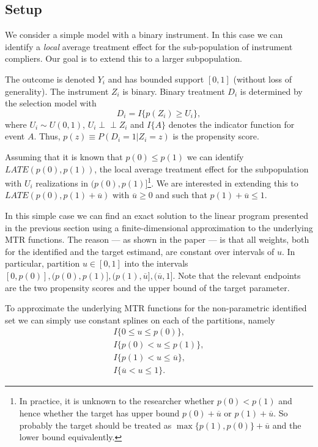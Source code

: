 \documentclass[11pt,a4paper,english]{article} %
\newcommand{\indep}{\perp\!\!\!\!\perp}
\numberwithin{equation}{section}
\numberwithin{figure}{section}
\numberwithin{table}{section}
\theoremstyle{definition}
\theoremstyle{remark}
\begin{document}
\subsection{Setup}
We consider a simple model with a binary instrument.
In this case we can identify a \textit{local} average treatment effect for the sub-population of instrument compliers.
Our goal is to extend this to a larger subpopulation.

The outcome is denoted $Y_i$ and has bounded support $[0,1]$ (without loss of generality).
The instrument $Z_i$ is binary.
Binary treatment $D_i$ is determined by the selection model with
\begin{equation}
	D_i = I\{p(Z_i) \geq U_i\},
\end{equation}
where $U_i\sim U(0,1)$, $U_i \indep Z_i$ and $I\{A\}$ denotes the indicator function for event $A$.
Thus, $p(z) \equiv P(D_i = 1 | Z_i = z)$ is the propensity score.

Assuming that it is known that $p(0) \leq p(1)$ we can identify $LATE(p(0), p(1))$, the local average treatment effect for the subpopulation with $U_i$ realizations in $\mathopen(p(0), p(1)\mathclose]$\footnote{In practice, it is unknown to the researcher whether $p(0) < p(1)$ and hence whether the target has upper bound $p(0) + \overline{u}$ or $p(1) + \overline{u}$. So probably the target should be treated as $\max\{p(1), p(0)\} + \overline{u}$ and the lower bound equivalently.}.
We are interested in extending this to $LATE(p(0), p(1) + \overline{u})$ with $\overline{u} \geq 0$ and such that $p(1) + \overline{u} \leq 1$.

In this simple case we can find an exact solution to the linear program presented in the previous section using a finite-dimensional approximation to the underlying MTR functions.
The reason --- as shown in the paper --- is that all weights, both for the identified and the target estimand, are constant over intervals of $u$.
In particular, partition $u\in[0,1]$ into the intervals $[0, p(0)], (p(0), p(1)], (p(1), \overline{u}], (\overline{u}, 1]$. Note that the relevant endpoints are the two propensity scores and the upper bound of the target parameter.

To approximate the underlying MTR functions for the non-parametric identified set we can simply use constant splines on each of the partitions, namely
\begin{align}
	I\{0 \leq u \leq p(0)\}, \\
	I\{p(0) < u \leq p(1)\}, \\
	I\{p(1) < u \leq \overline{u}\}, \\
	I\{\overline{u} < u \leq 1\}.
\end{align}
\end{document}
